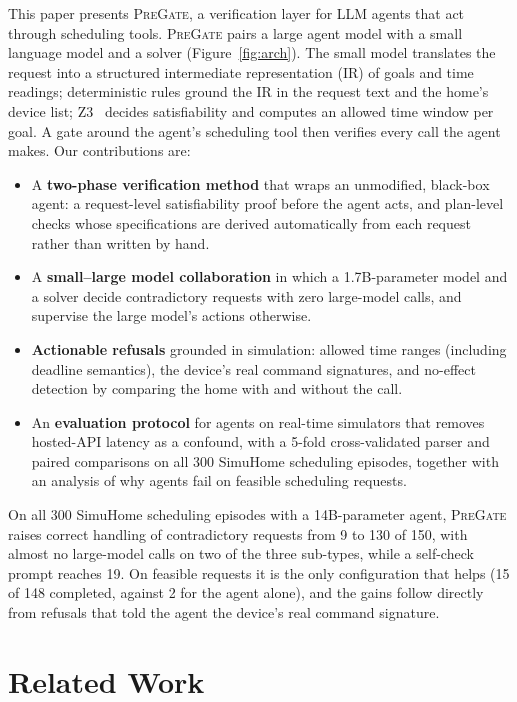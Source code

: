 \documentclass[sigconf]{aamas}
\newcommand{\sys}{\textsc{PreGate}}
\begin{document}
This paper presents \sys{}, a verification layer for LLM agents that act through scheduling tools. \sys{} pairs
a large agent model with a small language model and a solver (Figure~\ref{fig:arch}). The small model translates
the request into a structured intermediate representation (IR) of goals and time readings; deterministic rules
ground the IR in the request text and the home's device list; Z3~\cite{demoura2008z3} decides satisfiability and
computes an allowed time window per goal. A gate around the agent's scheduling tool then verifies every call
the agent makes. Our contributions are:
\begin{itemize}
  \item A \textbf{two-phase verification method} that wraps an unmodified, black-box agent: a request-level
  satisfiability proof before the agent acts, and plan-level checks whose specifications are derived
  automatically from each request rather than written by hand.
  \item A \textbf{small--large model collaboration} in which a 1.7B-parameter model and a solver decide
  contradictory requests with zero large-model calls, and supervise the large model's actions otherwise.
  \item \textbf{Actionable refusals} grounded in simulation: allowed time ranges (including deadline semantics),
  the device's real command signatures, and no-effect detection by comparing the home with and without the call.
  \item An \textbf{evaluation protocol} for agents on real-time simulators that removes hosted-API latency as a
  confound, with a 5-fold cross-validated parser and paired comparisons on all 300 SimuHome scheduling episodes,
  together with an analysis of why agents fail on feasible scheduling requests.
\end{itemize}
On all 300 SimuHome scheduling episodes with a 14B-parameter agent, \sys{} raises correct handling of
contradictory requests from 9 to 130 of 150, with almost no large-model calls on two of the three sub-types,
while a self-check prompt reaches 19. On feasible requests it is the only configuration that helps (15 of 148
completed, against 2 for the agent alone), and the gains follow directly from refusals that told the agent the
device's real command signature.

\section{Related Work}
\end{document}
